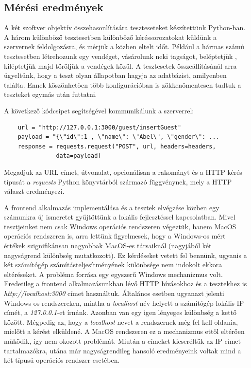 \documentclass[12pt]{article}
\begin{document}
\subsection{Mérési eredmények}

A két szoftver objektív összehasonlítására teszteseteket készítettünk Python-ban. A három különböző tesztesetben különböző kéréssorozatokat küldünk a szervernek feldolgozásra, és mérjük a közben eltelt időt. Például a hármas számú tesztesetben létrehozunk egy vendéget,  vásárolunk neki tagságot,  beléptetjük , kiléptetjük majd töröljük a vendégek közül.  A tesztesetek összeállításánál arra ügyeltünk, hogy a teszt olyan állapotban hagyja az adatbázist, amilyenben találta. Ennek köszönhetően több konfigurációban is zökkenőmentesen tudtuk a teszteket egymás után futtatni.

A következő kódcsipet segítségével kommunikálunk a szerverrel:
\begin{verbatim}
    url = "http://127.0.0.1:3000/guest/insertGuest"
    payload = "{\"id\":1 , \"name\": \"Abel\", \"gender\": ...
    response = requests.request("POST", url, headers=headers, 
               data=payload)
\end{verbatim}

Megadjuk az URL címet, útvonalat, opcionálisan a rakományt és a HTTP kérés típusát a \textit{requests} Python könyvtárból származó függvénynek, mely a HTTP választ eredményezi.

A frontend alkalmazás implementálása és a tesztek elvégzése közben egy számunkra új ismeretet gyűjtöttünk a lokális fejlesztéssel kapcsolatban. Mivel tesztjeinket nem csak Windows operációs rendszeren végeztük, hanem MacOS operációs rendszeren is, arra lettünk figyelmesek, hogy a Windows-os mért értékek szignifikánsan nagyobbak MacOS-es társaiknál (nagyjából két nagyságrend különbség mutatkozott). Ez kérdéseket vetett fel bennünk, ugyanis a két számítógép számításteljesítményének különbsége nem indokolt ekkora eltéréseket. A probléma forrása egy egyszerű Windows mechanizmus volt. Eredetileg a frontend alkalmazásunkban lévő HTTP hívásokhoz és a tesztekhez is \textit{http://localhost:3000} címet használtuk. Általános esetben ugyanazt jelenti Windows-os rendszereken, mintha a \textit{localhost} név helyett a számítógép lokális IP címét, a \textit{127.0.0.1}-et írnánk. Azonban van egy igen lényeges különbség a kettő között. Mégpedig az, hogy a \textit{localhost} nevet a rendszernek még fel kell oldania, mielőtt a kérést elküldené. A MacOS rendszeren ez a mechanizmus ettől eltérően működik, így nem okozott problémát. Miután a címeket kicseréltük az IP címet tartalmazókra, utána már nagyságrendileg hansoló eredményeink voltak mind a két típusú operációs rendszer esetében.
\end{document}

